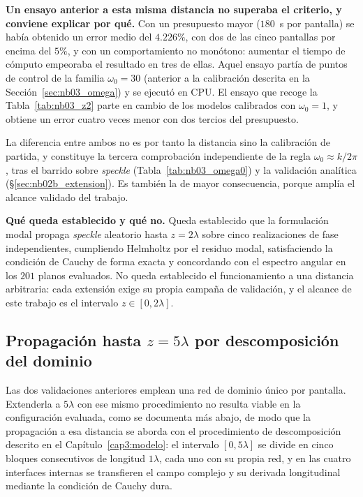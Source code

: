 \textbf{Un ensayo anterior a esta misma distancia no superaba el criterio, y
conviene explicar por qué.} Con un presupuesto mayor ($180$~s por pantalla) se
había obtenido un error medio del $4.226\%$, con dos de las cinco pantallas por
encima del $5\%$, y con un comportamiento no monótono: aumentar el tiempo de
cómputo empeoraba el resultado en tres de ellas. Aquel ensayo partía de puntos
de control de la familia $\omega_0=30$ (anterior a la calibración descrita en
la Sección~\ref{sec:nb03_omega}) y se ejecutó en CPU. El ensayo que recoge la
Tabla~\ref{tab:nb03_z2} parte en cambio de los modelos calibrados con
$\omega_0=1$, y obtiene un error cuatro veces menor con dos tercios del
presupuesto.

La diferencia entre ambos no es por tanto la distancia sino la calibración de
partida, y constituye la tercera comprobación independiente de la regla
$\omega_0\approx k/2\pi$, tras el barrido sobre \textit{speckle}
(Tabla~\ref{tab:nb03_omega0}) y la validación analítica
(§\ref{sec:nb02b_extension}). Es también la de mayor consecuencia, porque
amplía el alcance validado del trabajo.

\textbf{Qué queda establecido y qué no.} Queda establecido que la formulación
modal propaga \textit{speckle} aleatorio hasta $z=2\lambda$ sobre cinco
realizaciones de fase independientes, cumpliendo Helmholtz por el residuo
modal, satisfaciendo la condición de Cauchy de forma exacta y concordando con
el espectro angular en los $201$ planos evaluados. No queda establecido el
funcionamiento a una distancia arbitraria: cada extensión exige su propia
campaña de validación, y el alcance de este trabajo es el intervalo
$z\in[0,2\lambda]$.

\subsection{Propagación hasta \texorpdfstring{$z=5\lambda$}{z=5 lambda} por descomposición del dominio}
\label{sec:nb03_z5}

Las dos validaciones anteriores emplean una red de dominio único por pantalla.
Extenderla a $5\lambda$ con ese mismo procedimiento no resulta viable en la
configuración evaluada, como se documenta más abajo, de modo que la propagación
a esa distancia se aborda con el procedimiento de descomposición descrito en el
Capítulo~\ref{cap3:modelo}: el intervalo $[0,5\lambda]$ se divide en cinco
bloques consecutivos de longitud $1\lambda$, cada uno con su propia red, y en
las cuatro interfaces internas se transfieren el campo complejo y su derivada
longitudinal mediante la condición de Cauchy dura.

